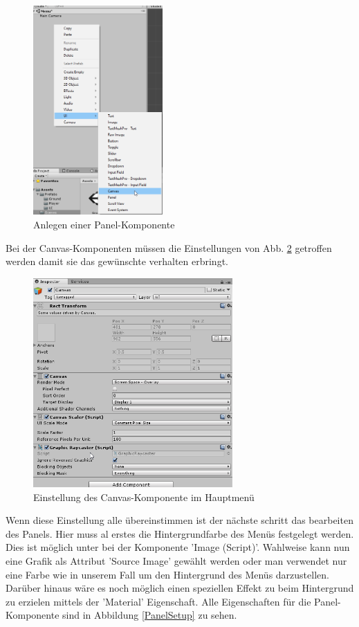 \begin{figure}[H]

	\includegraphics[height=8cm]{images/PanelAnlegen.png}
	\caption{Anlegen einer Panel-Komponente}
	\label{PanelAnlegen}
\end{figure}
Bei der Canvas-Komponenten müssen die Einstellungen von Abb. \ref{CanvasSetup} getroffen werden damit sie das gewünschte verhalten erbringt.
\begin{figure}[H]
	\centering
	\includegraphics[height=8cm]{images/CanvasSetup.png}
	\caption{Einstellung des Canvas-Komponente im Hauptmenü}
	\label{CanvasSetup}
\end{figure}
Wenn diese Einstellung alle übereinstimmen ist der nächste schritt das bearbeiten des Panels. Hier muss al erstes die Hintergrundfarbe des Menüs festgelegt werden. Dies ist möglich unter bei der Komponente 'Image (Script)'. Wahlweise kann nun eine Grafik als Attribut 'Source Image' gewählt werden oder man verwendet nur eine Farbe wie in unserem Fall um den Hintergrund des Menüs darzustellen. Darüber hinaus wäre es noch möglich einen speziellen Effekt zu beim Hintergrund zu erzielen mittels der 'Material' Eigenschaft. Alle Eigenschaften für die Panel-Komponente sind in Abbildung \ref{PanelSetup} zu sehen.
